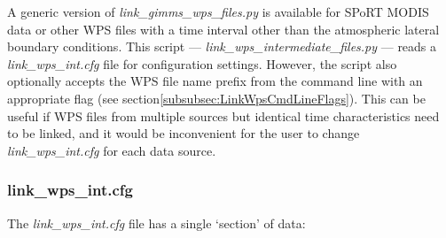 \documentclass{article}
\begin{document}
A generic version of \textit{link\_gimms\_wps\_files.py} is available for
SPoRT MODIS data or other WPS files with a time interval other
than the atmospheric lateral boundary conditions.  This script ---
\textit{link\_wps\_intermediate\_files.py} --- reads a 
\textit{link\_wps\_int.cfg} file for configuration settings.  However, the 
script also optionally accepts the WPS file name prefix from the command line 
with an appropriate flag (see section\ref{subsubsec:LinkWpsCmdLineFlags}). 
This can be useful if WPS files from multiple sources but identical time 
characteristics need to be linked, and it would be inconvenient for the user
to change \textit{link\_wps\_int.cfg} for each data source.

\subsubsection{link\_wps\_int.cfg}
\label{subsubsec:LinkWpsIntCfg}

The \emph{link\_wps\_int.cfg} file has a single `section' of data:
\end{document}
